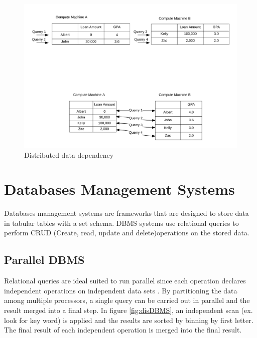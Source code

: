 \documentclass[10pt,twocolumn]{IEEEtran11}
\begin{document}
\begin{figure}[h]
\centering
\includegraphics[scale=0.12]{images/parallelComputation.png}
\caption{Distributed data dependency}
\label{fig:distDataDependency}
\end{figure}

\section{Databases Management Systems}

Databases management systems are frameworks that are designed to store data in tabular tables with a set schema.  DBMS systems use relational queries to perform CRUD 
(Create, read, update and delete)operations on the stored data.  


\subsection{Parallel DBMS}

Relational queries are ideal suited to run parallel since each operation declares independent operations on independent data sets \cite{dewitt1992parallel}.  By partitioning the data among multiple processors, a single query can be carried out in parallel and the result merged into a final step.  In figure \ref{fig:disDBMS}, an independent scan (ex. look for key word) is applied and the results are sorted by binning by first letter. The final result of each independent operation is merged into the final result.
\end{document}
